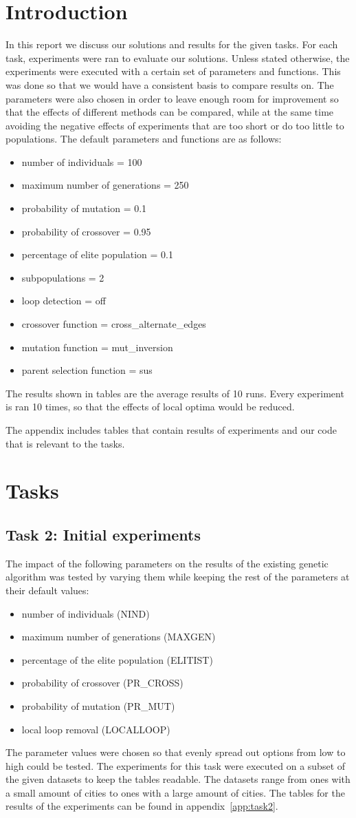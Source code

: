 \documentclass{report}
\newcommand{\mychapter}[2]{
    \setcounter{chapter}{#1}
    \setcounter{section}{0}
    \chapter*{#2}
    \addcontentsline{toc}{chapter}{#2}
}
\begin{document}
\mychapter{0}{Introduction}
In this report we discuss our solutions and results for the given tasks. For each task, experiments were ran to evaluate our solutions. Unless stated otherwise, the experiments were executed with a certain set of parameters and functions. This was done so that we would have a consistent basis to compare results on. The parameters were also chosen in order to leave enough room for improvement so that the effects of different methods can be compared, while at the same time avoiding the negative effects of experiments that are too short or do too little to populations. The default parameters and functions are as follows:
\begin{itemize}
	\item number of individuals = 100
	\item maximum number of generations = 250
	\item probability of mutation = 0.1
	\item probability of crossover = 0.95
	\item percentage of elite population = 0.1
	\item subpopulations = 2
	\item loop detection = off
	\item crossover function = cross\_alternate\_edges
	\item mutation function = mut\_inversion
	\item parent selection function = sus
\end{itemize}
The results shown in tables are the average results of 10 runs. Every experiment is ran 10 times, so that the effects of local optima would be reduced.

The appendix includes tables that contain results of experiments and our code that is relevant to the tasks.

\mychapter{1}{Tasks}

\section{Task 2: Initial experiments}
The impact of the following parameters on the results of the existing genetic algorithm was tested by varying them while keeping the rest of the parameters at their default values:
\begin{itemize}
	\item number of individuals (NIND)
	\item maximum number of generations (MAXGEN)
	\item percentage of the elite population (ELITIST)
	\item probability of crossover (PR\_CROSS)
	\item probability of mutation (PR\_MUT)
	\item local loop removal (LOCALLOOP)
\end{itemize}
The parameter values were chosen so that evenly spread out options from low to high could be tested. The experiments for this task were executed on a subset of the given datasets to keep the tables readable. The datasets range from ones with a small amount of cities to ones with a large amount of cities. The tables for the results of the experiments can be found in appendix~\ref{app:task2}.
\end{document}
